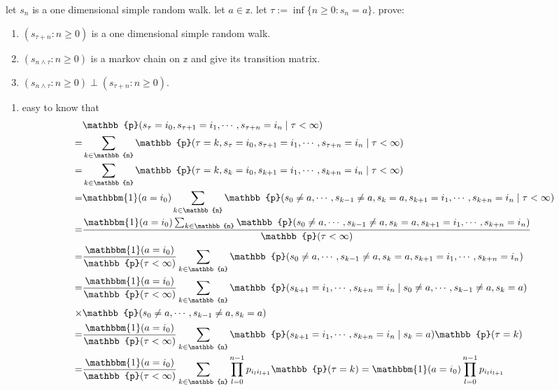 \documentclass{ctexart}
\begin{document}
\begin{problem}\label{pro:2}
  let \(s_n\) is a one dimensional simple random walk. let \(a \in \mathbb{z}\).
  let \(\tau := \inf \{n \geq 0: s_n =a\}\).
  prove:
  \begin{enumerate}
    \item \((s_{\tau + n}:n \geq 0)\) is a one dimensional simple random walk.
    \item \((s_{n \wedge \tau }:n \geq 0)\) is a markov chain on \(\mathbb{z}\) and give its
      transition matrix.
    \item \((s_{n \wedge \tau}:n \geq 0) \perp (s_{\tau + n}: n \geq 0)\).
  \end{enumerate}
\end{problem}
\begin{solution}
  \begin{enumerate}
    \item easy to know that
      \[
        \begin{aligned}
           & \mathbb{p}(s_\tau=i_0,s_{\tau+1}=i_1,\cdots,s_{\tau+n}=i_n \mid \tau<\infty)
          \\= & \sum_{k \in \mathbb{n}}\mathbb{p}(\tau=k,s_\tau=i_0,s_{\tau+1}=i_1,\cdots,s_{\tau+n}=i_n \mid \tau<\infty)
          \\= & \sum_{k \in \mathbb{n}}\mathbb{p}(\tau=k,s_k=i_0,s_{k+1}=i_1,\cdots,s_{k+n}=i_n \mid \tau<\infty)
          \\= & \mathbbm{1}(a=i_0) \sum_{k \in \mathbb{n}}\mathbb{p}(s_0 \neq a,\cdots,s_{k-1}\neq a,s_k=a,s_{k+1}=i_1,\cdots,s_{k+n}=i_n \mid \tau<\infty)
          \\= & \frac{\mathbbm{1}(a=i_0) \sum_{k \in \mathbb{n}}\mathbb{p}(s_0 \neq a,\cdots,s_{k-1}\neq a,s_k=a,s_{k+1}=i_1,\cdots,s_{k+n}=i_n )}{\mathbb{p}(\tau<\infty)}
          \\= & \frac{\mathbbm{1}(a=i_0)}{\mathbb{p}(\tau<\infty)} \sum_{k \in \mathbb{n}}\mathbb{p}(s_0 \neq a,\cdots,s_{k-1}\neq a,s_k=a,s_{k+1}=i_1,\cdots,s_{k+n}=i_n)
          \\= & \frac{\mathbbm{1}(a=i_0)}{\mathbb{p}(\tau<\infty)} \sum_{k \in \mathbb{n}}\mathbb{p}(s_{k+1}=i_1,\cdots,s_{k+n}=i_n \mid s_0 \neq a,\cdots,s_{k-1}\neq a,s_k=a)
          \\ \times & \mathbb{p}(s_0 \neq a,\cdots,s_{k-1}\neq a,s_k=a)
          \\= & \frac{\mathbbm{1}(a=i_0)}{\mathbb{p}(\tau<\infty)} \sum_{k \in \mathbb{n}}\mathbb{p}(s_{k+1}=i_1,\cdots,s_{k+n}=i_n \mid s_k=a) \mathbb{p}(\tau=k)
          \\= & \frac{\mathbbm{1}(a=i_0)}{\mathbb{p}(\tau<\infty)} \sum_{k \in \mathbb{n}}\prod_{l=0}^{n-1} p_{i_l i_{l+1}} \mathbb{p}(\tau=k)=\mathbbm{1}(a=i_0) \prod_{l=0}^{n-1} p_{i_l i_{l+1}}

\end{aligned}\]
\end{enumerate}
\end{solution}
\end{document}
